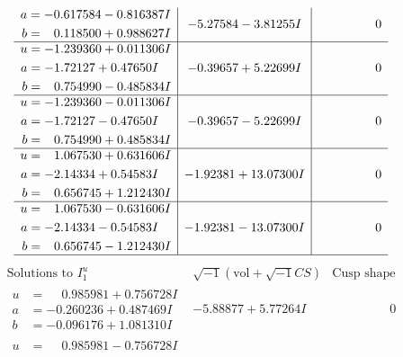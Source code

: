 \documentclass[1p]{elsarticle_modified}
\theoremstyle{definition}
\newcommand{\I}{\sqrt{-1}}
\begin{document}
$$\begin{array}{c|c|c}
\begin{aligned}
a &= -0.617584 - 0.816387 I \\
b &= \phantom{-}0.118500 + 0.988627 I\end{aligned}
 & -5.27584 - 3.81255 I & \phantom{-0.000000 } 0 \\ \hline\begin{aligned}
u &= -1.239360 + 0.011306 I \\
a &= -1.72127 + 0.47650 I \\
b &= \phantom{-}0.754990 - 0.485834 I\end{aligned}
 & -0.39657 + 5.22699 I & \phantom{-0.000000 } 0 \\ \hline\begin{aligned}
u &= -1.239360 - 0.011306 I \\
a &= -1.72127 - 0.47650 I \\
b &= \phantom{-}0.754990 + 0.485834 I\end{aligned}
 & -0.39657 - 5.22699 I & \phantom{-0.000000 } 0 \\ \hline\begin{aligned}
u &= \phantom{-}1.067530 + 0.631606 I \\
a &= -2.14334 + 0.54583 I \\
b &= \phantom{-}0.656745 + 1.212430 I\end{aligned}
 & -1.92381 + 13.07300 I & \phantom{-0.000000 } 0 \\ \hline\begin{aligned}
u &= \phantom{-}1.067530 - 0.631606 I \\
a &= -2.14334 - 0.54583 I \\
b &= \phantom{-}0.656745 - 1.212430 I\end{aligned}
 & -1.92381 - 13.07300 I & \phantom{-0.000000 } 0\\
 \hline 
 \end{array}$$\newpage$$\begin{array}{c|c|c}  
\text{Solutions to }I^u_{1}& \I (\text{vol} + \sqrt{-1}CS) & \text{Cusp shape}\\
 \hline 
\begin{aligned}
u &= \phantom{-}0.985981 + 0.756728 I \\
a &= -0.260236 + 0.487469 I \\
b &= -0.096176 + 1.081310 I\end{aligned}
 & -5.88877 + 5.77264 I & \phantom{-0.000000 } 0 \\ \hline\begin{aligned}
u &= \phantom{-}0.985981 - 0.756728 I \\

\end{aligned}
\end{array}$$
\end{document}

